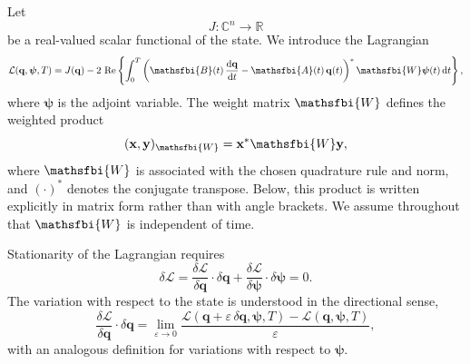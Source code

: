 \begin{appendices}
Let
\begin{equation}
  J:\mathbb{C}^{n}\to\mathbb{R}
  \label{eq:loop_functional_definition}
\end{equation}
be a real-valued scalar functional of the state. We introduce the Lagrangian
\begin{equation}
  \mathcal{L}(\mathbf{q},\boldsymbol{\psi},T)
  =
  J(\mathbf{q})
  -
  2\,\operatorname{Re}
  \left\{
    \int_{0}^{T}
      \left(
        \mathsfbi{B}(t)\,\frac{\mathrm{d}\mathbf{q}}{\mathrm{d}t}
        -
        \mathsfbi{A}(t)\,\mathbf{q}(t)
      \right)^{*}
      \mathsfbi{W}\boldsymbol{\psi}(t)
    \,\mathrm{d}t
  \right\},
  \label{eq:loop_lagrangian}
\end{equation}
where \(\boldsymbol{\psi}\) is the adjoint variable. The weight matrix \(\mathsfbi{W}\) defines the weighted product
\begin{equation}
  (\mathbf{x},\mathbf{y})_{\mathsfbi{W}}
  =
  \mathbf{x}^{*}\mathsfbi{W}\mathbf{y},
  \label{eq:loop_weighted_inner_product}
\end{equation}
where \(\mathsfbi{W}\) is associated with the chosen quadrature rule and norm, and \((\cdot)^{*}\) denotes the conjugate transpose. Below, this product is written explicitly in matrix form rather than with angle brackets. We assume throughout that \(\mathsfbi{W}\) is independent of time.

Stationarity of the Lagrangian requires
\begin{equation}
  \delta \mathcal{L}
  =
  \frac{\delta \mathcal{L}}{\delta \mathbf{q}}\cdot\delta\mathbf{q}
  +
  \frac{\delta \mathcal{L}}{\delta \boldsymbol{\psi}}\cdot\delta\boldsymbol{\psi}
  =
  0 .
  \label{eq:loop_stationarity}
\end{equation}
The variation with respect to the state is understood in the directional sense,
\begin{equation}
  \frac{\delta \mathcal{L}}{\delta \mathbf{q}}\cdot\delta\mathbf{q}
  =
  \lim_{\varepsilon\to 0}
  \frac{
    \mathcal{L}(\mathbf{q}+\varepsilon\,\delta\mathbf{q},\boldsymbol{\psi},T)
    -
    \mathcal{L}(\mathbf{q},\boldsymbol{\psi},T)
  }{\varepsilon},
  \label{eq:loop_directional_variation_q}
\end{equation}
with an analogous definition for variations with respect to \(\boldsymbol{\psi}\).


\end{appendices}
